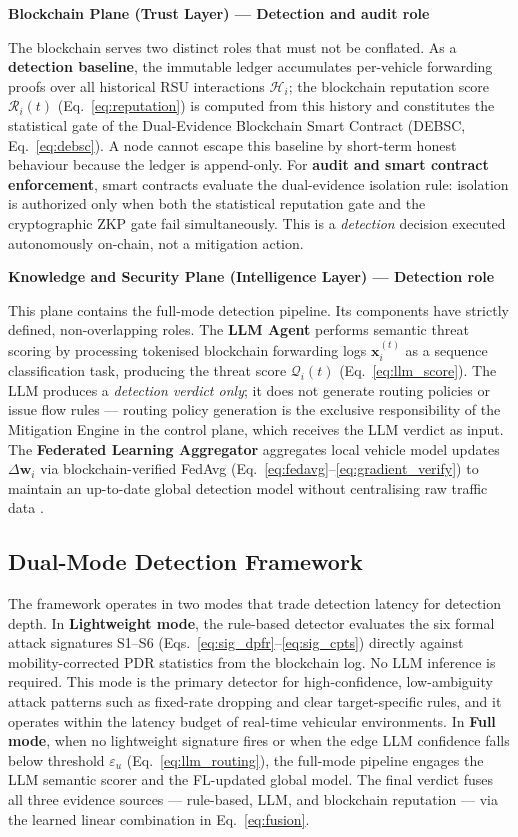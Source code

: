 \documentclass[12pt, a4paper]{report}
\newcommand{\mypar}{\vspace{0.8em}\noindent}
\begin{document}
\mypar
\textbf{Blockchain Plane (Trust Layer) — Detection and audit role}

\mypar
The blockchain serves two distinct roles that must not be conflated.
As a \textbf{detection baseline}, the immutable ledger accumulates per-vehicle forwarding proofs over all historical RSU interactions $\mathcal{H}_i$; the blockchain reputation score $\mathcal{R}_i(t)$ (Eq.~\eqref{eq:reputation}) is computed from this history and constitutes the statistical gate of the Dual-Evidence Blockchain Smart Contract (DEBSC, Eq.~\eqref{eq:debsc}). A node cannot escape this baseline by short-term honest behaviour because the ledger is append-only.
For \textbf{audit and smart contract enforcement}, smart contracts evaluate the dual-evidence isolation rule: isolation is authorized only when both the statistical reputation gate and the cryptographic ZKP gate fail simultaneously. This is a \emph{detection} decision executed autonomously on-chain, not a mitigation action.

\mypar
\textbf{Knowledge and Security Plane (Intelligence Layer) — Detection role}

\mypar
This plane contains the full-mode detection pipeline. Its components have strictly defined, non-overlapping roles.
The \textbf{LLM Agent} performs semantic threat scoring by processing tokenised blockchain forwarding logs $\mathbf{x}_i^{(t)}$ as a sequence classification task, producing the threat score $\mathcal{Q}_i(t)$ (Eq.~\eqref{eq:llm_score}). The LLM produces a \emph{detection verdict only}; it does not generate routing policies or issue flow rules — routing policy generation is the exclusive responsibility of the Mitigation Engine in the control plane, which receives the LLM verdict as input.
The \textbf{Federated Learning Aggregator} aggregates local vehicle model updates $\Delta\mathbf{w}_i$ via blockchain-verified FedAvg (Eq.~\eqref{eq:fedavg}--\eqref{eq:gradient_verify}) to maintain an up-to-date global detection model without centralising raw traffic data \cite{yurdem2024}.

\subsection{Dual-Mode Detection Framework}

The framework operates in two modes that trade detection latency for detection depth.
In \textbf{Lightweight mode}, the rule-based detector evaluates the six formal attack signatures S1--S6 (Eqs.~\eqref{eq:sig_dpfr}--\eqref{eq:sig_cpts}) directly against mobility-corrected PDR statistics from the blockchain log. No LLM inference is required. This mode is the primary detector for high-confidence, low-ambiguity attack patterns such as fixed-rate dropping and clear target-specific rules, and it operates within the latency budget of real-time vehicular environments.
In \textbf{Full mode}, when no lightweight signature fires or when the edge LLM confidence falls below threshold $\varepsilon_u$ (Eq.~\eqref{eq:llm_routing}), the full-mode pipeline engages the LLM semantic scorer and the FL-updated global model. The final verdict fuses all three evidence sources — rule-based, LLM, and blockchain reputation — via the learned linear combination in Eq.~\eqref{eq:fusion}.
\end{document}

